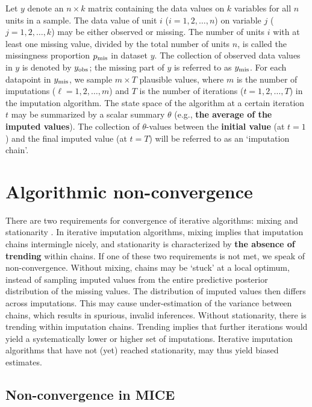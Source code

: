 \documentclass[Royal,times,sageh]{sagej}
\begin{document}
Let \(y\) denote an \(n \times k\) matrix containing the data values on \(k\) variables for all \(n\) units in a sample. The data value of unit \(i\) (\(i = 1, 2, \dots, n\)) on variable \(j\) (\(j = 1, 2, \dots, k\)) may be either observed or missing. The number of units \(i\) with at least one missing value, divided by the total number of units \(n\), is called the missingness proportion \(p_{\rm mis}\) in dataset \(y\). The collection of observed data values in \(y\) is denoted by \(y_{\rm obs}\); the missing part of \(y\) is referred to as \(y_{\rm mis}\). For each datapoint in \(y_{\rm mis}\), we sample \(m \times T\) plausible values, where \(m\) is the number of imputations (\(\ell = 1, 2, \dots, m\)) and \(T\) is the number of iterations (\(t = 1, 2, \dots, T\)) in the imputation algorithm. The state space of the algorithm at a certain iteration \(t\) may be summarized by a scalar summary \(\theta\) (e.g., \textbf{the average of the imputed values}). The collection of \(\theta\)-values between the \textbf{initial value} (at \(t=1\)) and the final imputed value (at \(t=T\)) will be referred to as an `imputation chain'.

\hypertarget{algorithmic-non-convergence}{%
\section{Algorithmic non-convergence}\label{algorithmic-non-convergence}}

There are two requirements for convergence of iterative algorithms: mixing and stationarity \citep{gelm13}. In iterative imputation algorithms, mixing implies that imputation chains intermingle nicely, and stationarity is characterized by \textbf{the absence of trending} within chains. If one of these two requirements is not met, we speak of non-convergence. Without mixing, chains may be `stuck' at a local optimum, instead of sampling imputed values from the entire predictive posterior distribution of the missing values. The distribution of imputed values then differs across imputations. This may cause under-estimation of the variance between chains, which results in spurious, invalid inferences. Without stationarity, there is trending within imputation chains. Trending implies that further iterations would yield a systematically lower or higher set of imputations. Iterative imputation algorithms that have not (yet) reached stationarity, may thus yield biased estimates.

\hypertarget{non-convergence-in-mice}{%
\subsection{Non-convergence in MICE}\label{non-convergence-in-mice}}
\end{document}
